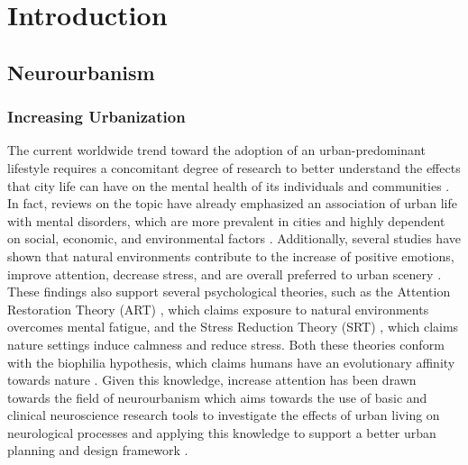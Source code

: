 
\chapter{Introduction}
\label{chapter:introduction}

\section{Neurourbanism}
\label{section:neurourbanism}

\subsection{Increasing Urbanization}

The current worldwide trend toward the adoption of an urban-predominant lifestyle requires a concomitant degree of research to better understand the effects that city life can have on the mental health of its individuals and communities \cite{adliNeurourbanismNewDiscipline2017}. In fact, reviews on the topic have already emphasized an association of urban life with mental disorders, which are more prevalent in cities and highly dependent on social, economic, and environmental factors \cite{galeaURBANHEALTHEvidence2005, ventriglioUrbanizationEmergingMental2021}. Additionally, several studies have shown that natural environments contribute to the increase of positive emotions, improve attention, decrease stress, and are overall preferred to urban scenery \cite{kondoDoesSpendingTime2018, meidenbauerGradualDevelopmentPreference2019, ohlyAttentionRestorationTheory2016}. These findings also support several psychological theories, such as the Attention Restoration Theory (ART) \cite{kaplanRestorativeBenefitsNature1995}, which claims exposure to natural environments overcomes mental fatigue, and the Stress Reduction Theory (SRT) \cite{ulrichAestheticAffectiveResponse1983}, which claims nature settings induce calmness and reduce stress. Both these theories conform with the biophilia hypothesis, which claims humans have an evolutionary affinity towards nature \cite{jimenezAssociationsNatureExposure2021}. 
Given this knowledge, increase attention has been drawn towards the field of neurourbanism which aims towards the use of basic and clinical neuroscience research tools to investigate the effects of urban living on neurological processes and applying this knowledge to support a better urban planning and design framework \cite{adliNeurourbanismNewDiscipline2017,mondscheinNewDirectionsCognitiveEnvironmental2018}.

